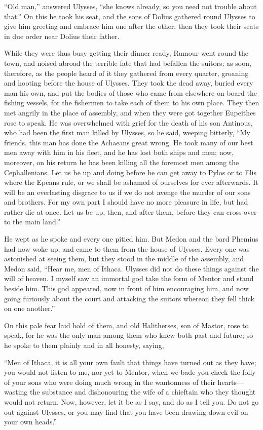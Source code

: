 “Old man,” answered Ulysses, “she knows already, so you need not trouble about
that.” On this he took his seat, and the sons of Dolius gathered round Ulysses
to give him greeting and embrace him one after the other; then they took their
seats in due order near Dolius their father.

While they were thus busy getting their dinner ready, Rumour went round the
town, and noised abroad the terrible fate that had befallen the suitors; as
soon, therefore, as the people heard of it they gathered from every quarter,
groaning and hooting before the house of Ulysses. They took the dead away,
buried every man his own, and put the bodies of those who came from elsewhere
on board the fishing vessels, for the fishermen to take each of them to his own
place. They then met angrily in the place of assembly, and when they were got
together Eupeithes rose to speak. He was overwhelmed with grief for the death
of his son Antinous, who had been the first man killed by Ulysses, so he said,
weeping bitterly, “My friends, this man has done the Achaeans great wrong. He
took many of our best men away with him in his fleet, and he has lost both
ships and men; now, moreover, on his return he has been killing all the
foremost men among the Cephallenians. Let us be up and doing before he can get
away to Pylos or to Elis where the Epeans rule, or we shall be ashamed of
ourselves for ever afterwards. It will be an everlasting disgrace to us if we
do not avenge the murder of our sons and brothers. For my own part I should
have no more pleasure in life, but had rather die at once. Let us be up, then,
and after them, before they can cross over to the main land.”

He wept as he spoke and every one pitied him. But Medon and the bard Phemius
had now woke up, and came to them from the house of Ulysses. Every one was
astonished at seeing them, but they stood in the middle of the assembly, and
Medon said, “Hear me, men of Ithaca. Ulysses did not do these things against
the will of heaven. I myself saw an immortal god take the form of Mentor and
stand beside him. This god appeared, now in front of him encouraging him, and
now going furiously about the court and attacking the suitors whereon they fell
thick on one another.”

On this pale fear laid hold of them, and old Halitherses, son of Mastor, rose
to speak, for he was the only man among them who knew both past and future; so
he spoke to them plainly and in all honesty, saying,

“Men of Ithaca, it is all your own fault that things have turned out as they
have; you would not listen to me, nor yet to Mentor, when we bade you check the
folly of your sons who were doing much wrong in the wantonness of their
hearts—wasting the substance and dishonouring the wife of a chieftain who they
thought would not return. Now, however, let it be as I say, and do as I tell
you. Do not go out against Ulysses, or you may find that you have been drawing
down evil on your own heads.”

